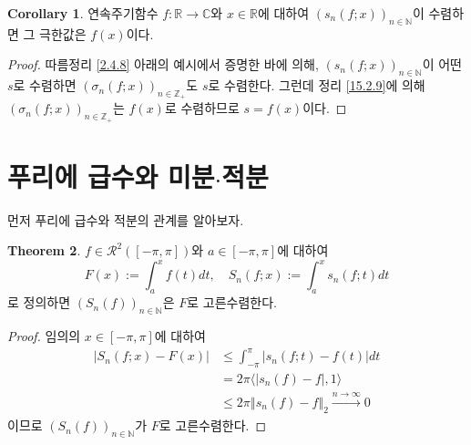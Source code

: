 \documentclass[11pt]{book}
\numberwithin{equation}{chapter}
\def\NN{\mathbb{N}}
\def\ZZ{\mathbb{Z}}
\def\RR{\mathbb{R}}
\def\CC{\mathbb{C}}
\def\calR{\mathcal{R}}
\newcommand{\inner}[2]{\langle#1, #2\rangle}
\newcommand{\abs}[1]{\left\vert#1\right\vert}
\newcommand{\norm}[1]{\left\Vert#1\right\Vert}
\theoremstyle{definition}
\newtheorem{thm}{Theorem}[section]
\newtheorem{cor}[thm]{Corollary}
\begin{document}
\begin{cor}
    연속주기함수 \(f : \RR \to \CC\)와 \(x \in \RR\)에 대하여 \((s_n(f; x))_{n \in \NN}\)이 수렴하면 그 극한값은 \(f(x)\)이다.
\end{cor}
\begin{proof}
    따름정리 \ref{2.4.8} 아래의 예시에서 증명한 바에 의해, \((s_n(f; x))_{n \in \NN}\)이 어떤 \(s\)로 수렴하면 \((\sigma_n(f; x))_{n \in \ZZ_+}\)도 \(s\)로 수렴한다. 그런데 정리 \ref{15.2.9}에 의해 \((\sigma_n(f; x))_{n \in \ZZ_+}\)는 \(f(x)\)로 수렴하므로 \(s = f(x)\)이다.
\end{proof}

\section{푸리에 급수와 미분$\cdot$적분}

먼저 푸리에 급수와 적분의 관계를 알아보자.

\begin{thm} \label{15.3.1}
    \(f \in \calR^2([-\pi, \pi])\)와 \(a \in [-\pi, \pi]\)에 대하여
    \[
        F(x) := \int_a^x f(t) dt, \quad S_n(f; x) := \int_a^x s_n(f ; t) dt
    \]
    로 정의하면  \((S_n(f))_{n \in \NN}\)은 \(F\)로 고른수렴한다.
\end{thm}
\begin{proof}
    임의의 \(x \in [-\pi, \pi]\)에 대하여
    \begin{align*}
        \abs{S_n(f; x) - F(x)} &\le \int_{-\pi}^\pi \abs{s_n(f; t) - f(t)} dt\\
        &= 2\pi \inner{\abs{s_n(f) - f}}{1}\\
        &\le 2\pi \norm{s_n(f) - f}_2 \xrightarrow[]{n \to \infty} 0
    \end{align*}
    이므로 \((S_n(f))_{n \in \NN}\)가 \(F\)로 고른수렴한다.
\end{proof}
\end{document}
